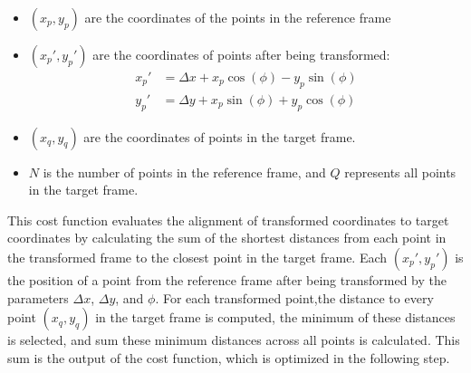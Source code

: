 \documentclass{micro-econ-thesis}
\begin{document}
\begin{itemize}
	\item $ (x_p, y_p) $ are the coordinates of the points in the reference frame
	\item $(x_p', y_p')$ are the coordinates of points after being transformed:
	\begin{align*}
		x_p' &= \Delta x + x_p \cos(\phi) - y_p \sin(\phi) \\
		y_p' &= \Delta y + x_p \sin(\phi) + y_p \cos(\phi)
	\end{align*}
	\item $(x_q, y_q)$ are the coordinates of points in the target frame.
	\item $N$ is the number of points in the reference frame, and $Q$ represents all points in the target frame.
\end{itemize}

This cost function evaluates the alignment of transformed coordinates to target coordinates by calculating the sum of the shortest distances from each point in the transformed frame to the closest point in the target frame. Each $(x_p', y_p')$ is the position of a point from the reference frame after being transformed by the parameters $\Delta x$, $\Delta y$, and $\phi$. For each transformed point,the distance to every point $(x_q, y_q)$ in the target frame is computed, the minimum of these distances is selected, and sum these minimum distances across all points is calculated. This sum is the output of the cost function, which is optimized in the following step. 
\end{document}
